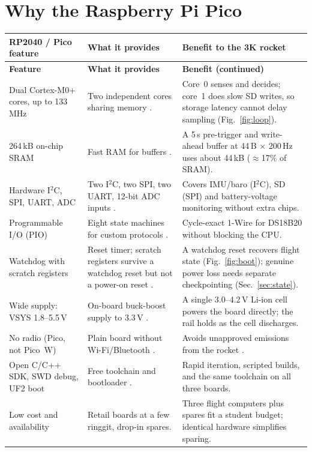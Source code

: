 \section{Why the Raspberry Pi Pico}
\small
{}
\begin{longtable}{@{}L{36mm}L{58mm}L{56mm}@{}}
\toprule{}\textbf{RP2040 / Pico feature}&\textbf{What it provides}&\textbf{Benefit to the 3K rocket}\\\midrule\endfirsthead
\toprule{}\textbf{Feature}&\textbf{What it provides}&\textbf{Benefit (continued)}\\\midrule\endhead
\bottomrule\endlastfoot
Dual Cortex-M0+ cores, up to 133\,MHz & Two independent cores sharing memory \cite{rp2040ds}. & Core~0 senses and decides; core~1 does slow SD writes, so storage latency cannot delay sampling (Fig.~\ref{fig:loop}).\\
264\,kB on-chip SRAM & Fast RAM for buffers \cite{rp2040ds}. & A 5\,s pre-trigger and write-ahead buffer at 44\,B $\times$ 200\,Hz uses about 44\,kB ($\approx$17\% of SRAM).\\
Hardware I$^2$C, SPI, UART, ADC & Two I$^2$C, two SPI, two UART, 12-bit ADC inputs \cite{rp2040ds}. & Covers IMU/baro (I$^2$C), SD (SPI) and battery-voltage monitoring without extra chips.\\
Programmable I/O (PIO) & Eight state machines for custom protocols \cite{rp2040ds}. & Cycle-exact 1-Wire for DS18B20 without blocking the CPU.\\
Watchdog with scratch registers & Reset timer; scratch registers survive a watchdog reset but not a power-on reset \cite{rp2040ds}. & A watchdog reset recovers flight state (Fig.~\ref{fig:boot}); genuine power loss needs separate checkpointing (Sec.~\ref{sec:state}).\\
Wide supply: VSYS 1.8--5.5\,V & On-board buck-boost supply to 3.3\,V \cite{picods}. & A single 3.0--4.2\,V Li-ion cell powers the board directly; the rail holds as the cell discharges.\\
No radio (Pico, not Pico~W) & Plain board without Wi-Fi/Bluetooth \cite{picods}. & Avoids unapproved emissions from the rocket \cite{rtc2027app03}.\\
Open C/C++ SDK, SWD debug, UF2 boot & Free toolchain and bootloader \cite{picosdk}. & Rapid iteration, scripted builds, and the same toolchain on all three boards.\\
Low cost and availability & Retail boards at a few ringgit, drop-in spares. & Three flight computers plus spares fit a student budget; identical hardware simplifies sparing.\\
\end{longtable}
\normalsize

